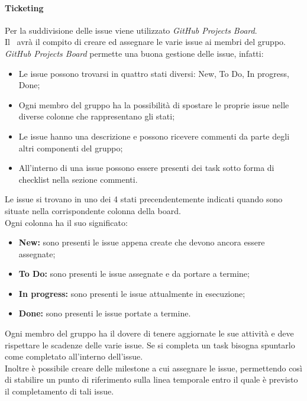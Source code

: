      \paragraph{Ticketing}
        Per la suddivisione delle issue viene utilizzato \textit{GitHub Projects Board}\glo.\\
        Il \roleProjectManager\ avrà il compito di creare ed assegnare le varie issue ai membri del gruppo.\\
        \textit{GitHub Projects Board} permette una buona gestione delle issue, infatti:
        \begin{itemize}
          \item Le issue possono trovarsi in quattro stati diversi: New, To Do, In progress, Done;
          \item Ogni membro del gruppo ha la possibilità di spostare le proprie issue nelle diverse colonne che rappresentano gli stati;
          \item Le issue hanno una descrizione e possono ricevere commenti da parte degli altri componenti del gruppo;
          \item All'interno di una issue possono essere presenti dei task sotto forma di checklist nella sezione commenti.
        \end{itemize}
        Le issue si trovano in uno dei 4 stati precendentemente indicati quando sono situate nella corrispondente colonna della board.\\
        Ogni colonna ha il suo significato:
        \begin{itemize}
          \item \textbf{New:} sono presenti le issue appena create che devono ancora essere assegnate;
          \item \textbf{To Do:} sono presenti le issue assegnate e da portare a termine;
          \item \textbf{In progress:} sono presenti le issue attualmente in esecuzione;
          \item \textbf{Done:} sono presenti le issue portate a termine.
        \end{itemize}
        Ogni membro del gruppo ha il dovere di tenere aggiornate le sue attività e deve rispettare le scadenze delle varie issue.
        Se si completa un task bisogna spuntarlo come completato all'interno dell'issue.\\
        Inoltre è possibile creare delle milestone a cui assegnare le issue, permettendo così di stabilire un punto di riferimento 
        sulla linea temporale entro il quale è previsto il completamento di tali issue.

